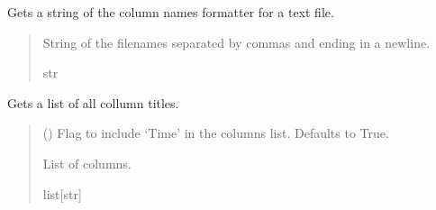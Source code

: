 \documentclass[letterpaper,10pt,english]{sphinxmanual}
\begin{document}
\begin{fulllineitems}
\begin{fulllineitems}
\end{fulllineitems}


\begin{fulllineitems}
\label{\detokenize{PodApi.Stream.PodHandler:PodApi.Stream.PodHandler.Handle8206HR.Drain8206HR.GetDeviceColNames}}
\pysigstartsignatures
{}
\pysigstopsignatures
\sphinxAtStartPar
Gets a string of the column names formatter for a text file.
\begin{quote}\begin{description}
\sphinxAtStartPar
String of the filenames separated by commas and ending in a newline.

\sphinxAtStartPar
str

\end{description}\end{quote}

\end{fulllineitems}


\begin{fulllineitems}
\label{\detokenize{PodApi.Stream.PodHandler:PodApi.Stream.PodHandler.Handle8206HR.Drain8206HR.GetDeviceColNamesList}}
\pysigstartsignatures
{}
\pysigstopsignatures
\sphinxAtStartPar
Gets a list of all collumn titles.
\begin{quote}\begin{description}
\sphinxAtStartPar
{} (\sphinxstyleliteralemphasis{\sphinxupquote{, }}) \textendash{} Flag to include ‘Time’ in the columns list.                 Defaults to True.

\sphinxAtStartPar
List of columns.

\sphinxAtStartPar
list{[}str{]}

\end{description}\end{quote}

\end{fulllineitems}


\end{fulllineitems}
\end{document}
